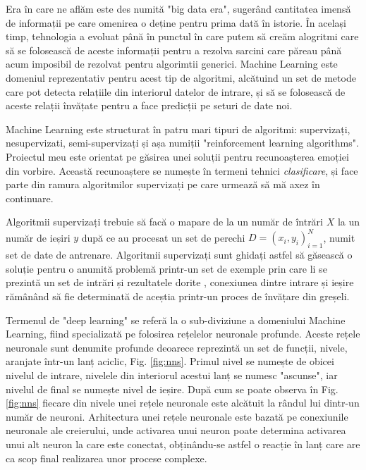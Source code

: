 \documentclass[a4paper,12pt]{book}
\begin{document}
			Era în care ne aflăm este des numită "big data era", sugerând cantitatea imensă de informații pe care omenirea o deține pentru prima dată în istorie. În același timp, tehnologia a evoluat până în punctul în care putem să creăm alogritmi care să se folosească de aceste informații pentru a rezolva sarcini care păreau până acum imposibil de rezolvat pentru algorimtii generici. Machine Learning este domeniul reprezentativ pentru acest tip de algoritmi, alcătuind un set de metode care pot detecta relațiile din interiorul datelor de intrare, și să se folosească de aceste relații învățate pentru a face predicții pe seturi de date noi. \par
			
			Machine Learning este structurat în patru mari tipuri de algoritmi: supervizați, nesupervizati, semi-supervizați și așa numiții "reinforcement learning algorithms". Proiectul meu este orientat pe găsirea unei soluții pentru recunoașterea emoției din vorbire. Această recunoaștere se numește în termeni tehnici \textit{clasificare}, și face parte din ramura algoritmilor supervizați pe care urmează să mă axez în continuare. \par 
			Algoritmii supervizați trebuie să facă o mapare de la un număr de întrări $X$ la un număr de ieșiri $y$ după ce au procesat un set de perechi $D={(x_i,y_i)}^N_{i=1}$, numit set de date de antrenare. Algoritmii supervizați sunt ghidați astfel să găsească o soluție pentru o anumită problemă printr-un set de exemple prin care li se prezintă un set de intrări și rezultatele dorite , conexiunea dintre intrare și ieșire rămânând să fie determinată de aceștia printr-un proces de învățare din greșeli. \par
			
			Termenul de "deep learning" se referă la o sub-diviziune a domeniului Machine Learning, fiind specializată pe folosirea rețelelor neuronale profunde. Aceste rețele neuronale sunt denumite profunde deoarece reprezintă un set de funcții, nivele, aranjate într-un lanț aciclic, Fig. \ref{fig:nns}. Primul nivel se numește de obicei nivelul de intrare, nivelele din interiorul acestui lanț se numesc "ascunse", iar nivelul de final se numește nivel de ieșire. După cum se poate observa în Fig. \ref{fig:nns} fiecare din nivele unei rețele neuronale este alcătuit la rândul lui dintr-un număr de neuroni. Arhitectura unei rețele neuronale este bazată pe conexiunile neuronale ale creierului, unde activarea unui neuron poate determina activarea unui alt neuron la care este conectat, obținându-se astfel o reacție în lanț care are ca scop final realizarea unor procese complexe. 
			
\end{document}
